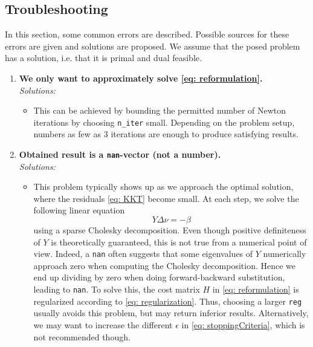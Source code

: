 \documentclass[letter]{article}
\begin{document}
\begin{sffamily}
\subsection{Troubleshooting}
In this section, some common errors are described. Possible sources for these errors are given and solutions are proposed. We assume that the posed problem has a solution, i.e. that it is primal and dual feasible.
\begin{enumerate}	
	\item \textbf{We only want to approximately solve \eqref{eq: reformulation}.} \\
		\emph{Solutions:}
			\begin{itemize}				
				\item This can be achieved by bounding the permitted number of Newton iterations by choosing \texttt{n\_iter} small. Depending on the problem setup, numbers as few as $3$ iterations are enough to produce satisfying results.
			\end{itemize}
	
	\item \textbf{Obtained result is a \texttt{nan}-vector (not a number).} \\
		\emph{Solutions:}
		\begin{itemize}
			\item This problem typically shows up as we approach the optimal solution, where the residuals \eqref{eq: KKT} become small. At each step, we solve the following linear equation
\begin{equation*}
	Y\Delta\nu = -\beta
\end{equation*}			
using a sparse Cholesky decomposition.	Even though positive definiteness of $Y$ is theoretically guaranteed, this is not true from a numerical point of view. Indeed, a \texttt{nan} often suggests that some eigenvalues of $Y$ numerically approach zero when computing the Cholesky decomposition. Hence we end up dividing by zero when doing forward-backward substitution, leading to \texttt{nan}. To solve this, the cost matrix $H$ in \eqref{eq: reformulation} is regularized according to \eqref{eq: regularization}. Thus, choosing a larger \texttt{reg} usually avoids this problem, but may return inferior results. Alternatively, we may want to increase the different $\epsilon$ in \eqref{eq: stoppingCriteria}, which is not recommended though.
		\end{itemize}
\end{enumerate}


\end{sffamily}
\end{document}
